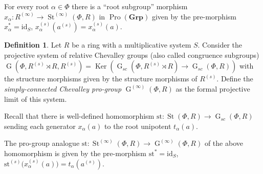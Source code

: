 \documentclass{article}
\numberwithin{equation}{section}
\theoremstyle{definition}
\newtheorem{df}[lemma]{Definition} \Crefname{df}{Definition}{Definitions}
\theoremstyle{remark}
\DeclareMathOperator\St{St}
\DeclareMathOperator\Ker{Ker}
\DeclareMathOperator\GG{G}
\DeclareMathOperator{\Pro}{Pro}
\newcommand{\Group}{\mathbf{Grp}}
\begin{document}
For every root $\alpha \in \Phi$ there is a ``root subgroup'' morphism $x_{\alpha} \colon R^{(\infty)} \to \St^{(\infty)}(\Phi, R)$ in $\Pro(\Group)$ given by the pre-morphism $x_\alpha^* = \mathrm{id}_S$, $x_\alpha^{(s)}(a^{(s)}) = x_\alpha^{(s)}(a)$.

\begin{df}
 Let $R$ be a ring with a multiplicative system $S$.
 Consider the projective system of relative Chevalley groups (also called congruence subgroups) 
 $\GG(\Phi, R^{(s)} \rtimes R, R^{(s)}) = \Ker\left(\GG_{sc}(\Phi, R^{(s)} \rtimes R) \to \GG_{sc}(\Phi, R)\right)$ with the structure morphisms given by the structure morphisms of \(R^{(s)}\). Define the {\it simply-connected Chevalley pro-group} $\GG^{(\infty)}(\Phi, R)$ as the formal projective limit of this system.
\end{df}


Recall that there is well-defined homomorphism $\mathrm{st}\colon \St(\Phi, R) \to \GG_{sc}(\Phi, R)$ sending each generator $x_\alpha(a)$ to the root unipotent $t_\alpha(a)$. 

The pro-group analogue \(\mathrm{st} \colon \St^{(\infty)}(\Phi, R) \to \GG^{(\infty)}(\Phi, R)\) of the above homomorphism is given by the pre-morphism \(\mathrm{st}^* = \mathrm{id}_S\), \(\mathrm{st}^{(s)}\bigl(x_{\alpha}^{(s)}(a)\bigr) = t_\alpha(a^{(s)})\). 
\end{document}
